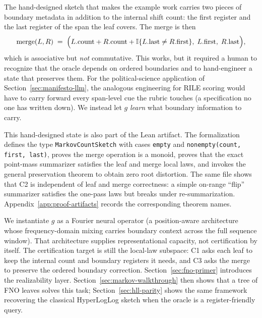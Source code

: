 The hand-designed sketch that makes the example work carries two pieces
of boundary metadata in addition to the internal shift count: the first
register and the last register of the span the leaf covers. The merge
is then
\[
\text{merge}(L, R) \;=\; \Big(L.\text{count} + R.\text{count} + \mathbb{I}\{L.\text{last} \neq R.\text{first}\},\; L.\text{first},\; R.\text{last}\Big),
\]
which is associative but \emph{not} commutative. This works, but it
required a human to recognize that the oracle depends on ordered
boundaries and to hand-engineer a state that preserves them. For the
political-science application of Section~\ref{sec:manifesto-llm}, the
analogous engineering for RILE scoring would have to carry forward
every span-level cue the rubric touches (a specification no one has
written down). We instead let $g$ \emph{learn} what boundary
information to carry.

This hand-designed state is also part of the Lean artifact. The
formalization defines the type \texttt{MarkovCountSketch} with cases
\texttt{empty} and \texttt{nonempty(count, first, last)}, proves the
merge operation is a monoid, proves that the exact point-mass
summarizer satisfies the leaf and merge local laws, and invokes the
general preservation theorem to obtain zero root distortion. The same
file shows that C2 is independent of leaf and merge correctness: a
simple on-range ``flip'' summarizer satisfies the one-pass laws but
breaks under re-summarization. Appendix~\ref{app:proof-artifacts}
records the corresponding theorem names.

We instantiate $g$ as a Fourier neural operator (a position-aware architecture whose frequency-domain mixing carries boundary context across the full sequence window). That architecture supplies representational capacity, not certification by itself. The certification target is still the local-law subspace: C1 asks each leaf to keep the internal count and boundary registers it needs, and C3 asks the merge to preserve the ordered boundary correction. Section~\ref{sec:fno-primer} introduces the realizability layer. Section~\ref{sec:markov-walkthrough} then shows that a tree of FNO leaves solves this task; Section~\ref{sec:hll-parity} shows the same framework recovering the classical HyperLogLog sketch when the oracle is a register-friendly query.
